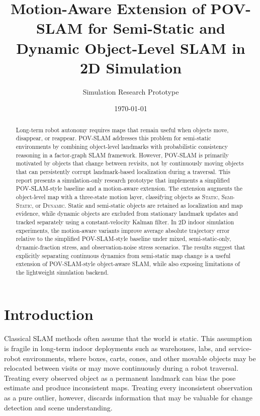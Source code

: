 ﻿\documentclass[11pt]{article}
\title{Motion-Aware Extension of POV-SLAM for Semi-Static and Dynamic Object-Level SLAM in 2D Simulation}
\author{Simulation Research Prototype}
\date{\today}
\newcommand{\Static}{\textsc{Static}}
\newcommand{\SemiStatic}{\textsc{Semi-Static}}
\newcommand{\Dynamic}{\textsc{Dynamic}}
\begin{document}
\maketitle

\begin{abstract}
Long-term robot autonomy requires maps that remain useful when objects move, disappear, or reappear. POV-SLAM addresses this problem for semi-static environments by combining object-level landmarks with probabilistic consistency reasoning in a factor-graph SLAM framework. However, POV-SLAM is primarily motivated by objects that change between revisits, not by continuously moving objects that can persistently corrupt landmark-based localization during a traversal. This report presents a simulation-only research prototype that implements a simplified POV-SLAM-style baseline and a motion-aware extension. The extension augments the object-level map with a three-state motion layer, classifying objects as \Static, \SemiStatic, or \Dynamic. Static and semi-static objects are retained as localization and map evidence, while dynamic objects are excluded from stationary landmark updates and tracked separately using a constant-velocity Kalman filter. In 2D indoor simulation experiments, the motion-aware variants improve average absolute trajectory error relative to the simplified POV-SLAM-style baseline under mixed, semi-static-only, dynamic-fraction stress, and observation-noise stress scenarios. The results suggest that explicitly separating continuous dynamics from semi-static map change is a useful extension of POV-SLAM-style object-aware SLAM, while also exposing limitations of the lightweight simulation backend.
\end{abstract}

\section{Introduction}
Classical SLAM methods often assume that the world is static. This assumption is fragile in long-term indoor deployments such as warehouses, labs, and service-robot environments, where boxes, carts, cones, and other movable objects may be relocated between visits or may move continuously during a robot traversal. Treating every observed object as a permanent landmark can bias the pose estimate and produce inconsistent maps. Treating every inconsistent observation as a pure outlier, however, discards information that may be valuable for change detection and scene understanding.
\end{document}
